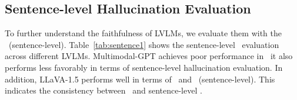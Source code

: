 \subsection{Sentence-level Hallucination Evaluation}
To further understand the faithfulness of LVLMs, we evaluate them with the \ours\ (sentence-level). Table~\ref{tab:sentence1} shows the sentence-level \ours\ evaluation across different LVLMs. 
Multimodal-GPT achieves poor performance in \ours\, it also performs less favorably in terms of sentence-level hallucination evaluation. In addition, LLaVA-1.5 performs well in terms of \ours\ and \ours\ (sentence-level). This indicates the consistency between \ours\ and sentence-level \ours.





